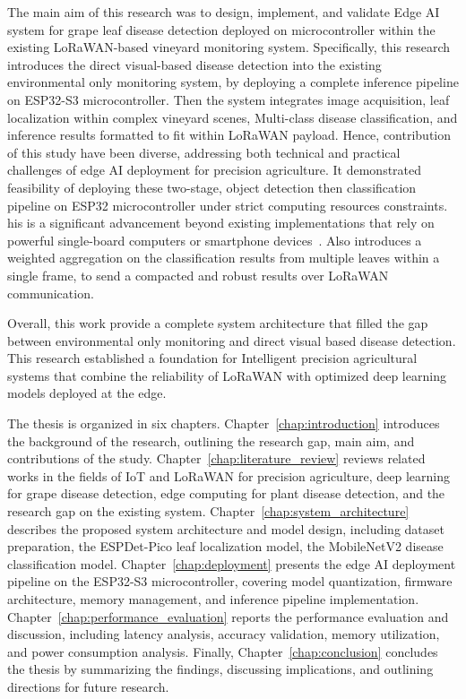 The main aim of this research was to design, implement, and validate Edge AI system for grape leaf disease detection deployed on microcontroller within the existing LoRaWAN-based vineyard monitoring system. Specifically, this research introduces the direct visual-based disease detection into the existing environmental only monitoring system, by deploying a complete inference pipeline on ESP32-S3 microcontroller. Then the system integrates image acquisition, leaf localization within complex vineyard scenes, Multi-class disease classification, and inference results formatted to fit within LoRaWAN payload. Hence, contribution of this study have been diverse, addressing both technical and practical challenges of edge AI deployment for precision agriculture. It demonstrated feasibility of deploying these two-stage, object detection then classification pipeline on ESP32 microcontroller under strict  computing resources constraints. his is a significant advancement beyond existing implementations that rely on powerful single-board computers or smartphone devices~\cite{karim2024enhancing, lazcano2025deep, mamun2025grape}. Also introduces a weighted aggregation on the classification results from multiple leaves within a single frame, to send a compacted and robust results over LoRaWAN communication. 

Overall, this work provide a complete system architecture that filled the gap between environmental only monitoring and direct visual based disease detection. This research established a foundation for Intelligent precision agricultural systems that combine the reliability of LoRaWAN with optimized deep learning models deployed at the edge.

The thesis is organized in six chapters. Chapter~\ref{chap:introduction} introduces the background of the research, outlining the research gap, main aim, and contributions of the study. Chapter~\ref{chap:literature_review} reviews related works in the fields of IoT and LoRaWAN for precision agriculture, deep learning for grape disease detection, edge computing for plant disease detection, and the research gap on the existing system. Chapter~\ref{chap:system_architecture} describes the proposed system architecture and model design, including dataset preparation, the ESPDet-Pico leaf localization model, the MobileNetV2 disease classification model. Chapter~\ref{chap:deployment} presents the edge AI deployment pipeline on the ESP32-S3 microcontroller, covering model quantization, firmware architecture, memory management, and inference pipeline implementation. Chapter~\ref{chap:performance_evaluation} reports the performance evaluation and discussion, including latency analysis, accuracy validation, memory utilization, and power consumption analysis. Finally, Chapter~\ref{chap:conclusion} concludes the thesis by summarizing the findings, discussing implications, and outlining directions for future research.

